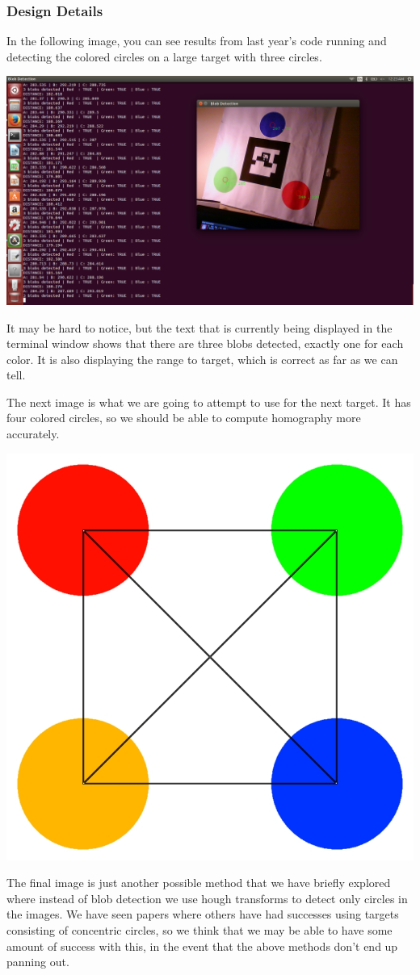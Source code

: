 \subsubsection{Design Details}
In the following image, you can see results from last year's code running and detecting the colored circles on a large target with three circles.

\begin{center} \includegraphics[width=.5\textwidth]{images/coolpic.png} \end{center}

It may be hard to notice, but the text that is currently being displayed in the terminal window shows that there are three blobs detected, exactly one for each color. It is also displaying the range to target, which is correct as far as we can tell.

The next image is what we are going to attempt to use for the next target. It has four colored circles, so we should be able to compute homography more accurately.

\begin{center} \includegraphics[width=.35\textwidth]{images/landing_guide_small_x.jpg} \end{center}

The final image is just another possible method that we have briefly explored where instead of blob detection we use hough transforms to detect only circles in the images. We have seen papers where others have had successes using targets consisting of concentric circles, so we think that we may be able to have some amount of success with this, in the event that the above methods don't end up panning out.

